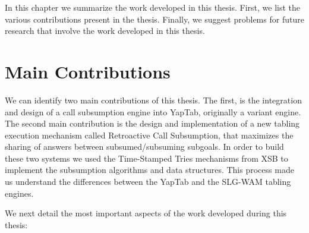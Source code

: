 
In this chapter we summarize the work developed in this thesis. First, we list the various contributions
present in the thesis. Finally, we suggest problems for future research that involve the work
developed in this thesis.

\section{Main Contributions}

We can identify two main contributions of this thesis. The first, is the integration and design of a call
subsumption engine into YapTab, originally a variant engine. The second main contribution is the design and implementation
of a new tabling execution mechanism called Retroactive Call Subsumption, that maximizes the sharing of answers
between subsumed/subsuming subgoals.
In order to build these two systems we used the Time-Stamped Tries mechanisms from XSB to implement the
subsumption algorithms and data structures. This process made us understand the differences between the
YapTab and the SLG-WAM tabling engines.

We next detail the most important aspects of the work developed during this thesis:

